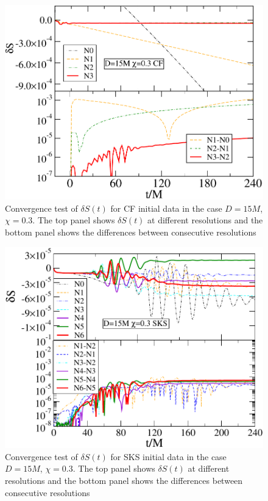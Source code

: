 \begin{figure}
  \includegraphics[width=0.95\columnwidth]{chap5/CFSConvergence1}
  \caption[Convergence test of $\delta S(t)$ for CF initial data.]{Convergence test of $\delta S(t)$ for CF initial data in the case
    $D=15M$, $\chi=0.3$. The top panel shows $\delta S(t)$ at different
    resolutions and the bottom panel shows the differences between
    consecutive resolutions}
  \label{fig:CFSConvergence1}
\end{figure}

\begin{figure}
  \includegraphics[width=0.95\columnwidth]{chap5/SKSSConvergence1}
  \caption[Convergence test of $\delta S(t)$ for SKS initial data.]{Convergence test of $\delta S(t)$ for SKS initial data in the case
    $D=15M$, $\chi=0.3$. The top panel shows $\delta S(t)$ at different
    resolutions and the bottom panel shows the differences between
    consecutive resolutions}
  \label{fig:SKSSConvergence1}
\end{figure}

